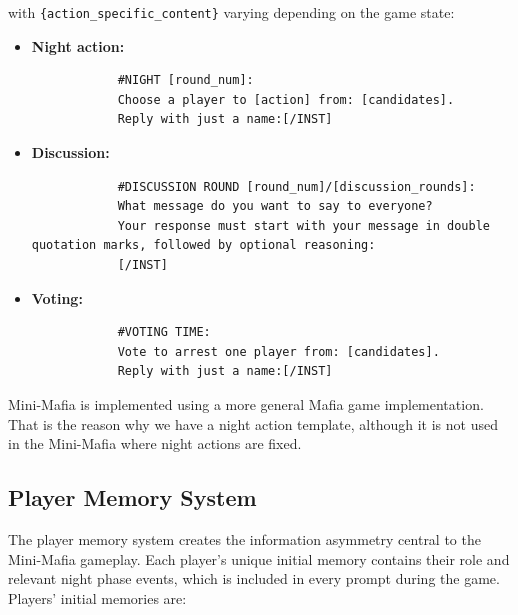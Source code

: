 \documentclass[sigconf,anonymous,balance=false]{aamas}
\begin{document}
with \texttt{\{action\_specific\_content\}} varying depending on the game state:

\begin{itemize}
    \item\textbf{Night action:}

    \begin{small}
        \begin{verbatim}
            #NIGHT [round_num]:
            Choose a player to [action] from: [candidates].
            Reply with just a name:[/INST]
        \end{verbatim}
    \end{small}

    \item\textbf{Discussion:}

    \begin{small}
        \begin{verbatim}
            #DISCUSSION ROUND [round_num]/[discussion_rounds]:
            What message do you want to say to everyone?
            Your response must start with your message in double quotation marks, followed by optional reasoning:
            [/INST]
        \end{verbatim}
    \end{small}

    \item\textbf{Voting:}

    \begin{small}
        \begin{verbatim}
            #VOTING TIME:
            Vote to arrest one player from: [candidates].
            Reply with just a name:[/INST]
        \end{verbatim}
    \end{small}
\end{itemize}
Mini-Mafia is implemented using a more general Mafia game implementation. That is the reason why we have a night action template, although it is not used in the Mini-Mafia where night actions are fixed.

\subsection{Player Memory System}
\label{appendix:memory}

The player memory system creates the information asymmetry central to the Mini-Mafia gameplay. Each player's unique initial memory contains their role and relevant night phase events, which is included in every prompt during the game. Players' initial memories are:
\end{document}
